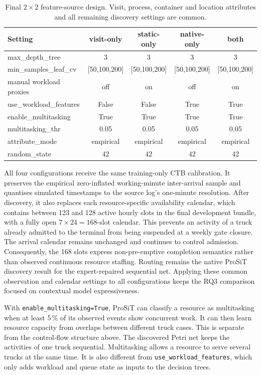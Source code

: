 \begin{table}[htbp]
\centering
\small
\setlength{\tabcolsep}{3pt}
\begin{tabularx}{\textwidth}{Ycccc}
\toprule
\textbf{Setting} & \textbf{visit-only} & \textbf{static-only} & \textbf{native-only} & \textbf{both} \\
\midrule
max\_depth\_tree          & 3 & 3 & 3 & 3 \\
min\_samples\_leaf\_cv   & [50,100,200] & [50,100,200] & [50,100,200] & [50,100,200] \\
manual workload proxies   & off & on & off & on \\
use\_workload\_features  & False & False & True & True \\
enable\_multitasking      & True & True & True & True \\
multitasking\_thr         & 0.05 & 0.05 & 0.05 & 0.05 \\
attribute\_mode           & empirical & empirical & empirical & empirical \\
random\_state             & 42 & 42 & 42 & 42 \\
\bottomrule
\end{tabularx}
\caption{Final $2\times2$ feature-source design. Visit, process, container and
location attributes and all remaining discovery settings are common.}
\label{tab:prosit_hyperparams}
\end{table}

All four configurations receive the same training-only CTB calibration. It
preserves the empirical zero-inflated working-minute inter-arrival sample and
quantises simulated timestamps to the source log's one-minute resolution.
After discovery, it also replaces each resource-specific availability calendar,
which contains between 123 and 128 active hourly slots in the final development
bundle, with a fully open $7\times24=168$-slot calendar. This prevents an
activity of a truck already admitted to the terminal from being suspended at a
weekly gate closure. The arrival calendar remains unchanged and continues to
control admission. Consequently, the 168 slots express non-pre-emptive
completion semantics rather than observed continuous resource staffing.
Routing remains the native ProSiT discovery result for the expert-repaired
sequential net. Applying these common observation and calendar settings to all
configurations keeps the RQ3 comparison focused on contextual model
expressiveness.

With \texttt{enable\_multitasking=True}, ProSiT can classify a resource as
multitasking when at least 5\,\% of its observed events show concurrent work.
It can then learn resource capacity from overlaps between different truck
cases. This is separate from the control-flow structure above. The discovered
Petri net keeps the activities of one truck sequential. Multitasking allows a
resource
to serve several trucks at the same time. It is also different from
\texttt{use\_workload\_features}, which only adds workload and queue state as
inputs to the decision trees.

